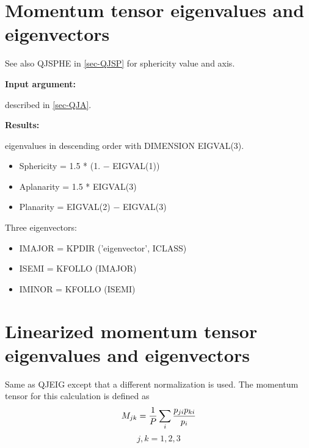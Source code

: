 \section{\label{sec-QJEI}Momentum tensor eigenvalues and eigenvectors}
\par
{}
\par
\par
See also QJSPHE in \ref{sec-QJSP} for sphericity value and axis.
 
{\bf Input argument:}
\begin{indentlist}{ 3.00cm}{ 3.25cm}
described in \ref{sec-QJA}.
\end{indentlist}
 
{\bf Results:}
 
\begin{indentlist}{ 3.00cm}{ 3.25cm}
eigenvalues in descending order
with DIMENSION EIGVAL(3).
\begin{itemize}
\item Sphericity = 1.5 * (1. $-$ EIGVAL(1))
\item Aplanarity = 1.5 * EIGVAL(3)
\item Planarity = EIGVAL(2) $-$ EIGVAL(3)
\end{itemize}
 
Three eigenvectors:
\begin{itemize}
\item IMAJOR = KPDIR ('eigenvector', ICLASS)
\item ISEMI = KFOLLO (IMAJOR)
\item IMINOR = KFOLLO (ISEMI)
\end{itemize}
\end{indentlist}
\section{\label{sec-QJEN}Linearized momentum tensor eigenvalues and
eigenvectors}
\par
{}
\par
\par
Same as QJEIG except that a different normalization is used.
The momentum tensor for this calculation is defined as
\begin{equation}
M_{{jk}}={1\over P}\sum _{i}{{p_{{ji}}p_{{ki}}}\over {p_{i}}}
\end{equation}
\begin{equation}
j,k=1,2,3
\end{equation}
\begin{indentlist}{ 3.00cm}{ 3.25cm}
\hspace*{1in}
\end{indentlist}
